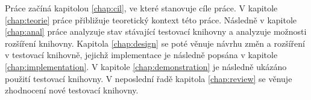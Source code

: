 \begin{introduction}
Práce začíná kapitolou \ref{chap:cil}, ve které stanovuje cíle práce. V kapitole \ref{chap:teorie} práce přibližuje teoretický kontext této práce. Následně v kapitole \ref{chap:anal} práce analyzuje stav stávající testovací knihovny a analyzuje možnosti rozšíření knihovny. Kapitola \ref{chap:design} se poté věnuje návrhu změn a rozšíření v testovací knihovně, jejichž implementace je následně popsána v kapitole \ref{chap:implementation}. V kapitole \ref{chap:demonstration} je následně ukázáno použití testovací knihovny. V neposlední řadě kapitola \ref{chap:review} se věnuje zhodnocení nové testovací knihovny. 
 
\end{introduction}